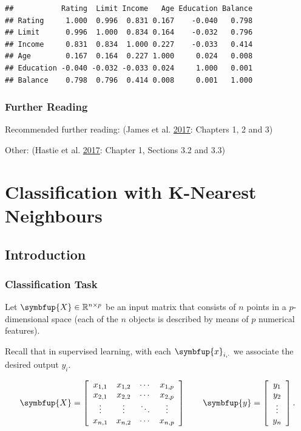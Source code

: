 \documentclass[10pt,b5paper,krantz1]{krantz}
\renewcommand{\mathbf}[1]{\symbfup{#1}}
\begin{document}
\begin{verbatim}
##           Rating  Limit Income   Age Education Balance
## Rating     1.000  0.996  0.831 0.167    -0.040   0.798
## Limit      0.996  1.000  0.834 0.164    -0.032   0.796
## Income     0.831  0.834  1.000 0.227    -0.033   0.414
## Age        0.167  0.164  0.227 1.000     0.024   0.008
## Education -0.040 -0.032 -0.033 0.024     1.000   0.001
## Balance    0.798  0.796  0.414 0.008     0.001   1.000
\end{verbatim}

\hypertarget{further-reading-1}{%
\subsection{Further Reading}\label{further-reading-1}}

Recommended further reading: (James et al. \protect\hyperlink{ref-islr}{2017}: Chapters 1, 2 and 3)

Other: (Hastie et al. \protect\hyperlink{ref-esl}{2017}: Chapter 1, Sections 3.2 and 3.3)

\hypertarget{classification-with-k-nearest-neighbours}{%
\chapter{Classification with K-Nearest Neighbours}\label{classification-with-k-nearest-neighbours}}

\hypertarget{introduction-3}{%
\section{Introduction}\label{introduction-3}}

\hypertarget{classification-task}{%
\subsection{Classification Task}\label{classification-task}}

Let \(\mathbf{X}\in\mathbb{R}^{n\times p}\) be an input matrix
that consists of \(n\) points in a \(p\)-dimensional space (each of the \(n\) objects
is described by means of \(p\) numerical features).

Recall that in supervised learning, with each
\(\mathbf{x}_{i,\cdot}\) we associate the desired output \(y_i\).

\[
\mathbf{X}=
\left[
\begin{array}{cccc}
x_{1,1} & x_{1,2} & \cdots & x_{1,p} \\
x_{2,1} & x_{2,2} & \cdots & x_{2,p} \\
\vdots & \vdots & \ddots & \vdots \\
x_{n,1} & x_{n,2} & \cdots & x_{n,p} \\
\end{array}
\right]
\qquad
\mathbf{y} = \left[
\begin{array}{c}
{y}_{1} \\
{y}_{2} \\
\vdots\\
{y}_{n} \\
\end{array}
\right].
\]
\end{document}
